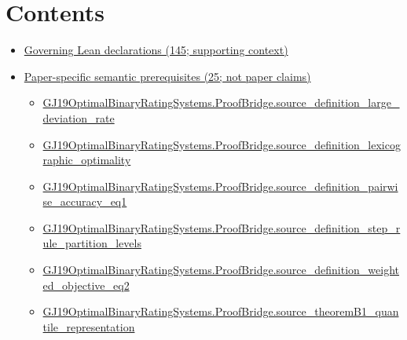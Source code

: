 \documentclass[10pt]{article}
\begin{document}
\section*{Contents}
\begin{itemize}[leftmargin=1.2em]
\item \hyperlink{governing-declaration-section-5ef5ef0364b6939c}{Governing Lean declarations (145; supporting context)}
\item \hyperlink{paper-prerequisite-section-5ef5ef0364b6939c}{Paper-specific semantic prerequisites (25; not paper claims)}
\begin{itemize}[leftmargin=1.2em]
\item \hyperlink{paper-prerequisite-3b848bccd24a63f2}{GJ19\allowbreak{}Optimal\allowbreak{}Binary\allowbreak{}Rating\allowbreak{}Systems.\allowbreak{}Proof\allowbreak{}Bridge.\allowbreak{}source\_\allowbreak{}definition\_\allowbreak{}large\_\allowbreak{}deviation\_\allowbreak{}rate}
\item \hyperlink{paper-prerequisite-f739ad70687ed269}{GJ19\allowbreak{}Optimal\allowbreak{}Binary\allowbreak{}Rating\allowbreak{}Systems.\allowbreak{}Proof\allowbreak{}Bridge.\allowbreak{}source\_\allowbreak{}definition\_\allowbreak{}lexicographic\_\allowbreak{}optimality}
\item \hyperlink{paper-prerequisite-b00077397b94e857}{GJ19\allowbreak{}Optimal\allowbreak{}Binary\allowbreak{}Rating\allowbreak{}Systems.\allowbreak{}Proof\allowbreak{}Bridge.\allowbreak{}source\_\allowbreak{}definition\_\allowbreak{}pairwise\_\allowbreak{}accuracy\_\allowbreak{}eq1}
\item \hyperlink{paper-prerequisite-2d3e4657a5885419}{GJ19\allowbreak{}Optimal\allowbreak{}Binary\allowbreak{}Rating\allowbreak{}Systems.\allowbreak{}Proof\allowbreak{}Bridge.\allowbreak{}source\_\allowbreak{}definition\_\allowbreak{}step\_\allowbreak{}rule\_\allowbreak{}partition\_\allowbreak{}levels}
\item \hyperlink{paper-prerequisite-b848ff2e7e41e74f}{GJ19\allowbreak{}Optimal\allowbreak{}Binary\allowbreak{}Rating\allowbreak{}Systems.\allowbreak{}Proof\allowbreak{}Bridge.\allowbreak{}source\_\allowbreak{}definition\_\allowbreak{}weighted\_\allowbreak{}objective\_\allowbreak{}eq2}
\item \hyperlink{paper-prerequisite-2205fa432ff57813}{GJ19\allowbreak{}Optimal\allowbreak{}Binary\allowbreak{}Rating\allowbreak{}Systems.\allowbreak{}Proof\allowbreak{}Bridge.\allowbreak{}source\_\allowbreak{}theorem\allowbreak{}B1\_\allowbreak{}quantile\_\allowbreak{}representation}

\end{itemize}
\end{itemize}
\end{document}
